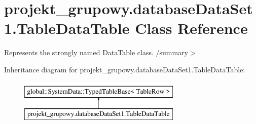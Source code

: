 \hypertarget{classprojekt__grupowy_1_1database_data_set1_1_1_table_data_table}{}\section{projekt\+\_\+grupowy.\+database\+Data\+Set1.\+Table\+Data\+Table Class Reference}
\label{classprojekt__grupowy_1_1database_data_set1_1_1_table_data_table}


Represents the strongly named Data\+Table class. /summary$>$  


Inheritance diagram for projekt\+\_\+grupowy.\+database\+Data\+Set1.\+Table\+Data\+Table\+:\begin{figure}[H]
\begin{center}
\leavevmode
\includegraphics[height=2.000000cm]{classprojekt__grupowy_1_1database_data_set1_1_1_table_data_table}
\end{center}
\end{figure}

